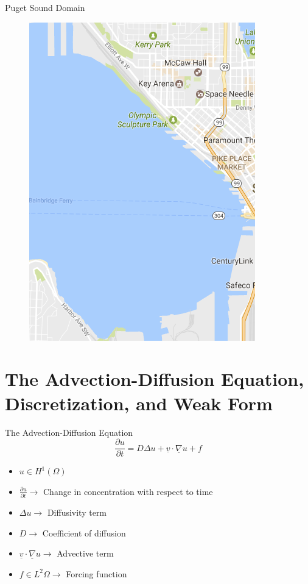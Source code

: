 \documentclass[10pt]{beamer}
\begin{document}
\begin{frame}{Puget Sound Domain}\label{Puget Sound Domain}
\begin{figure}

   \includegraphics[width=0.5\linewidth]{domain.png}
\end{figure}

\end{frame}

\section{The Advection-Diffusion Equation, Discretization, and Weak Form} 
\begin{frame}{The Advection-Diffusion Equation}\label{The Advection-Diffusion Equation}
\begin{equation}
\frac{\partial u}{\partial t}= D\Delta u + \underline{v} \cdot \underline{\nabla}u+f
\end{equation}
\begin{itemize}
\item $u \in  H^{1}\left(\Omega \right)$
\item $\frac{\partial u}{\partial t} \rightarrow$ Change in concentration with respect to time
\item $\Delta u \rightarrow$ Diffusivity term
\item $D \rightarrow$ Coefficient of diffusion
\item$\underline{v} \cdot \underline{\nabla}u \rightarrow$ Advective term
\item $f \in L^2{\Omega }\rightarrow$ Forcing function 
\end{itemize}
\hyperlink{Questions}{}
\end{frame}
\end{document}
